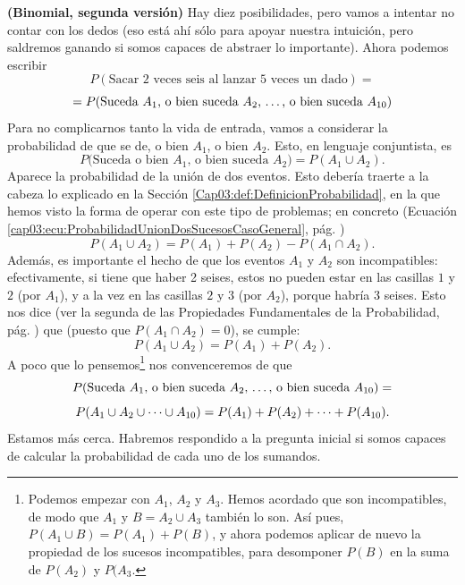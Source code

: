 \begin{Ejemplo}{\bf (Binomial, segunda versión)}
         Hay diez posibilidades, pero vamos a intentar no contar con los dedos (eso est\'a ah\'i s\'olo para apoyar nuestra intuici\'on, pero saldremos ganando si somos capaces de abstraer lo importante). Ahora podemos escribir
          	\[P(\text{Sacar $2$ veces seis al lanzar $5$ veces un dado})=\]
          	\[=P(\text{Suceda $A_1$, o bien suceda $A_2$, \dots, o bien suceda $A_{10}$})
          	\]
         Para no complicarnos tanto la vida de entrada, vamos a considerar la probabilidad de que se de, o bien $A_1$, o bien $A_2$. Esto, en lenguaje conjuntista, es
         \[P(\text{Suceda o bien $A_1$, o bien suceda $A_2$)}=P(A_1\cup A_2).\]
         Aparece la probabilidad de la uni\'on de dos eventos. Esto debería traerte a la cabeza
         lo explicado en la Secci\'on \ref{Cap03:def:DefinicionProbabilidad}, en la que hemos visto         la forma de operar con este tipo de problemas; en concreto (Ecuación \ref{cap03:ecu:ProbabilidadUnionDosSucesosCasoGeneral}, pág. \pageref{cap03:ecu:ProbabilidadUnionDosSucesosCasoGeneral})
		\[P(A_1\cup A_2)=P(A_1)+P(A_2)-P(A_1\cap A_2).\]
    Además, es importante el hecho de que los eventos $A_1$ y $A_2$ son incompatibles: efectivamente, si tiene que haber 2 seises, estos no pueden estar en las casillas $1$ y $2$ (por $A_1$), y a la vez en las casillas $2$ y $3$ (por $A_2$), porque habría 3 seises. Esto nos dice (ver la segunda de las Propiedades Fundamentales de la Probabilidad, pág. \pageref{cap03:def:PropiedadesFundamentalesFuncionProbabilidad}) que (puesto que $P(A_1\cap A_2)=0$), se cumple:
         \[P(A_1\cup A_2)=P(A_1)+P(A_2).\]
         A poco que lo pensemos\footnote{Podemos empezar con $A_1$, $A_2$ y $A_3$.
         Hemos acordado que son incompatibles, de modo que $A_1$ y $B=A_2\cup A_3$ tambi\'en lo son.
         As\'i pues, $P(A_1\cup B)= P(A_1)+P( B)$, y ahora podemos aplicar de nuevo la propiedad de los sucesos incompatibles, para desomponer $P(B)$ en la suma de $P(A_2)$ y $P(A_3$.} nos convenceremos de que
         \[P(\text{Suceda $A_1$, o bien suceda $A_2$, \dots, o bien suceda
         $A_{10}$})=\]
	\[P(A_1\cup A_2 \cup \cdots \cup A_{10}) =P(A_1)+P(A_2)+\cdots+P(A_{10}).\\
                   	\]
          Estamos más cerca. Habremos respondido a la pregunta inicial si somos capaces de calcular la probabilidad de cada uno de los sumandos.


\end{Ejemplo}
